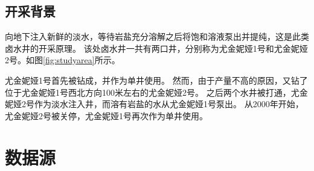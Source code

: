 \subsection{开采背景}
向地下注入新鲜的淡水，等待岩盐充分溶解之后将饱和溶液泵出并提纯，这是此类卤水井的开采原理。
该处卤水井一共有两口井，分别称为尤金妮娅1号和尤金妮娅2号。如图\ref{fig:studyarea}所示。

尤金妮娅1号首先被钻成，并作为单井使用。
然而，由于产量不高的原因，又钻了位于尤金妮娅1号西北方向100米左右的尤金妮娅2号。
之后两个水井被打通，尤金妮娅2号作为淡水注入井，而溶有岩盐的水从尤金妮娅1号泵出。
从2000年开始，尤金妮娅2号被关停，尤金妮娅1号再次作为单井使用。

\section{数据源}

